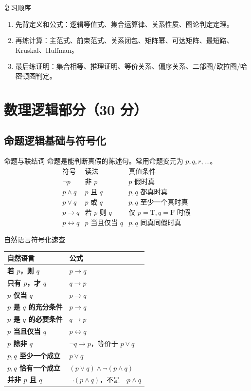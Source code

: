 \documentclass[UTF8,zihao=-4]{ctexart}
\newcommand{\True}{\mathrm T}
\newcommand{\False}{\mathrm F}
\begin{document}
\begin{methodbox}{复习顺序}
\begin{enumerate}
  \item 先背定义和公式：逻辑等值式、集合运算律、关系性质、图论判定定理。
  \item 再练计算：主范式、前束范式、关系闭包、矩阵幂、可达矩阵、最短路、Kruskal、Huffman。
  \item 最后练证明：集合相等、推理证明、等价关系、偏序关系、二部图/欧拉图/哈密顿图判定。
\end{enumerate}
\end{methodbox}

\section{数理逻辑部分（30 分）}

\subsection{命题逻辑基础与符号化}

\begin{corebox}{命题与联结词}
命题是能判断真假的陈述句。常用命题变元为 $p,q,r,\ldots$。
\[
\begin{array}{c|c|c}
\text{符号} & \text{读法} & \text{真值条件}\\\hline
\neg p & \text{非 }p & p\text{ 假时真}\\
p\land q & p\text{ 且 }q & p,q\text{ 都真时真}\\
p\lor q & p\text{ 或 }q & p,q\text{ 至少一个真时真}\\
p\to q & \text{若 }p\text{ 则 }q & \text{仅 }p=\True,q=\False\text{ 时假}\\
p\leftrightarrow q & p\text{ 当且仅当 }q & p,q\text{ 同真同假时真}
\end{array}
\]
\end{corebox}

\begin{methodbox}{自然语言符号化速查}
\begin{center}
\begin{tabularx}{\textwidth}{>{\bfseries}p{3.4cm}X}
\toprule
自然语言 & 公式 \\
\midrule
若 $p$，则 $q$ & $p\to q$ \\
只有 $p$，才 $q$ & $q\to p$ \\
$p$ 仅当 $q$ & $p\to q$ \\
$p$ 是 $q$ 的充分条件 & $p\to q$ \\
$p$ 是 $q$ 的必要条件 & $q\to p$ \\
$p$ 当且仅当 $q$ & $p\leftrightarrow q$ \\
$p$ 除非 $q$ & $\neg q\to p$，等价于 $p\lor q$ \\
$p,q$ 至少一个成立 & $p\lor q$ \\
$p,q$ 恰有一个成立 & $(p\lor q)\land\neg(p\land q)$ \\
并非 $p$ 且 $q$ & $\neg(p\land q)$，不是 $\neg p\land q$ \\
\bottomrule
\end{tabularx}
\end{center}
\end{methodbox}
\end{document}
